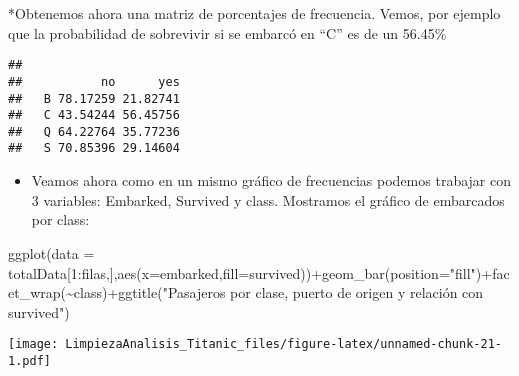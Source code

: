 \documentclass[
]{article}
\newenvironment{Shaded}{\begin{snugshade}}{\end{snugshade}}
\newcommand{\AttributeTok}[1]{\textcolor[rgb]{0.80,0.80,0.80}{#1}}
\newcommand{\ControlFlowTok}[1]{\textcolor[rgb]{0.94,0.87,0.69}{#1}}
\newcommand{\DecValTok}[1]{\textcolor[rgb]{0.86,0.86,0.80}{#1}}
\newcommand{\FunctionTok}[1]{\textcolor[rgb]{0.94,0.94,0.56}{#1}}
\newcommand{\NormalTok}[1]{\textcolor[rgb]{0.80,0.80,0.80}{#1}}
\newcommand{\OtherTok}[1]{\textcolor[rgb]{0.94,0.94,0.56}{#1}}
\newcommand{\SpecialCharTok}[1]{\textcolor[rgb]{0.86,0.64,0.64}{#1}}
\newcommand{\StringTok}[1]{\textcolor[rgb]{0.80,0.58,0.58}{#1}}
\providecommand{\tightlist}{%
  \setlength{\itemsep}{0pt}\setlength{\parskip}{0pt}}
\begin{document}
*Obtenemos ahora una matriz de porcentajes de frecuencia. Vemos, por
ejemplo que la probabilidad de sobrevivir si se embarcó en ``C'' es de
un 56.45\%

\begin{Shaded}
\end{Shaded}

\begin{verbatim}
##    
##           no      yes
##   B 78.17259 21.82741
##   C 43.54244 56.45756
##   Q 64.22764 35.77236
##   S 70.85396 29.14604
\end{verbatim}

\begin{itemize}
\tightlist
\item
  Veamos ahora como en un mismo gráfico de frecuencias podemos trabajar
  con 3 variables: Embarked, Survived y class. Mostramos el gráfico de
  embarcados por class:
\end{itemize}

\begin{Shaded}
\begin{Highlighting}[]
\FunctionTok{ggplot}\NormalTok{(}\AttributeTok{data =}\NormalTok{ totalData[}\DecValTok{1}\SpecialCharTok{:}\NormalTok{filas,],}\FunctionTok{aes}\NormalTok{(}\AttributeTok{x=}\NormalTok{embarked,}\AttributeTok{fill=}\NormalTok{survived))}\SpecialCharTok{+}\FunctionTok{geom\_bar}\NormalTok{(}\AttributeTok{position=}\StringTok{"fill"}\NormalTok{)}\SpecialCharTok{+}\FunctionTok{facet\_wrap}\NormalTok{(}\SpecialCharTok{\textasciitilde{}}\NormalTok{class)}\SpecialCharTok{+}\FunctionTok{ggtitle}\NormalTok{(}\StringTok{"Pasajeros por clase, puerto de origen y relación con survived"}\NormalTok{)}
\end{Highlighting}
\end{Shaded}

\texttt{[image: LimpiezaAnalisis\_Titanic\_files/figure-latex/unnamed-chunk-21-1.pdf]}
\end{document}
